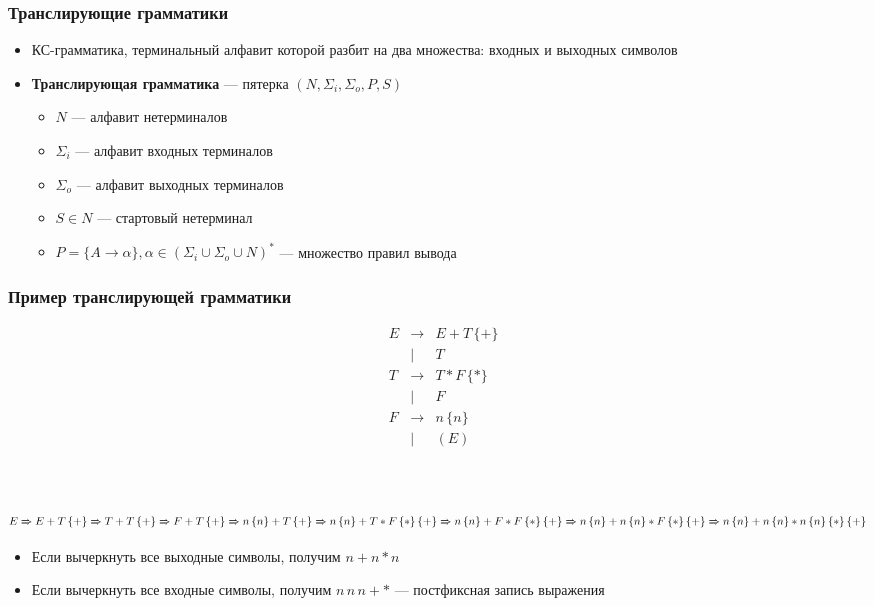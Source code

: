 \documentclass{beamer}
\newcommand{\derives}[0]{\xRightarrow[]{}}
\begin{document}
\begin{frame}[fragile]
  \transwipe[direction=90]
  \frametitle{Транслирующие грамматики}
  \begin{itemize}
    \item КС-грамматика, терминальный алфавит которой разбит на два множества: входных и выходных символов
    \item \textbf{Транслирующая грамматика} --- пятерка $(N, \Sigma_i, \Sigma_o, P, S)$
    \begin{itemize}
      \item $N$ --- алфавит нетерминалов
      \item $\Sigma_i$ --- алфавит входных терминалов
      \item $\Sigma_o$ --- алфавит выходных терминалов
      \item $S \in N$ --- стартовый нетерминал
      \item $P = \{ A \rightarrow \alpha \}, \alpha \in (\Sigma_i \cup \Sigma_o \cup N)^*$ --- множество правил вывода
    \end{itemize}
  \end{itemize}
\end{frame}

\begin{frame}[fragile]
  \transwipe[direction=90]
  \frametitle{Пример транслирующей грамматики}
$$
\begin{array}{cccl}
&E& \rightarrow & E + T \, \{ + \} \\
& &    |        & T   \\
&T& \rightarrow & T * F \, \{ * \} \\
& &    |        & F  \\
&F& \rightarrow & n \, \{ n \} \\
& &    |        & ( E ) \\
\end{array}
$$
\pause ~\\~

$E \derives E + T \, \{ + \} \derives T + T \, \{ + \} \derives F + T \, \{ + \} \derives n \, \{ n \} + T \, \{ + \} \derives n \, \{ n \} + T * F \, \{ * \} \, \{ + \} \derives n \, \{ n \} + F * F \, \{ * \} \, \{ + \} \derives n \, \{ n \} +  n \, \{ n \} * F \, \{ * \} \, \{ + \} \derives n \, \{ n \} +  n \, \{ n \} * n \, \{ n \} \, \{ * \} \, \{ + \}$

\pause
\begin{itemize}
  \item Если вычеркнуть все выходные символы, получим $n + n * n$
  \item Если вычеркнуть все входные символы, получим $n \, n \, n + *$ --- постфиксная запись выражения
\end{itemize}
\end{frame}
\end{document}
